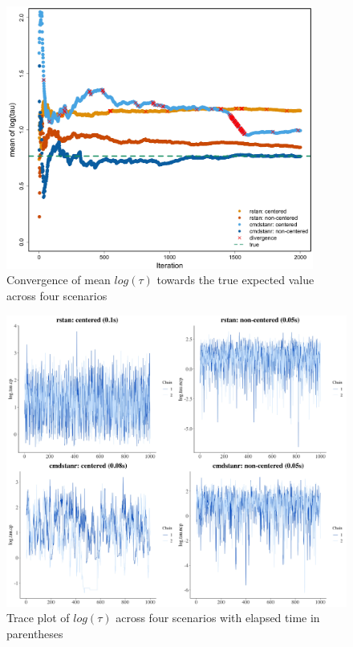 
\begin{figure}[H]
\centering
\includegraphics[width=0.9\textwidth]{Figures/Chp1_mean_tau.jpg}
\caption{Convergence of mean $log(\tau)$ towards the true expected value across four scenarios}
\label{fig:chp1_mean_tau}
\end{figure}

\begin{figure}[H]
\centering
\includegraphics[width=\textwidth]{Figures/Chp1_trace_tau.jpg}
\caption{Trace plot of $log(\tau)$ across four scenarios with elapsed time in parentheses}
\label{fig:chp1_trace_tau}
\end{figure}







